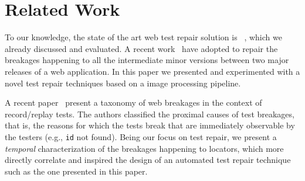 \section{Related Work}\label{sec:relwork}

 To our knowledge, the state of the art web test repair solution is \water~\cite{Choudhary:2011:WWA:2002931.2002935}, which we already discussed and evaluated. 
%
A recent work~\cite{Hammoudi-2016-FSE} have adopted \water to repair the breakages happening to all the intermediate minor versions between two major releases of a web application. In this paper we presented and experimented with a novel test repair techniques based on a image processing pipeline. 


A recent paper~\cite{Hammoudi-2016-ICST} present a taxonomy of web breakages in the context of record/replay tests. The authors classified the proximal causes of test breakages, that is, the reasons for which the tests break that are immediately observable by the testers (e.g., \texttt{id} not found). Being our focus on test repair, we present a \textit{temporal} characterization of the breakages happening to locators, which  more directly correlate and inspired the design of an automated test repair technique such as the one presented in this paper.

